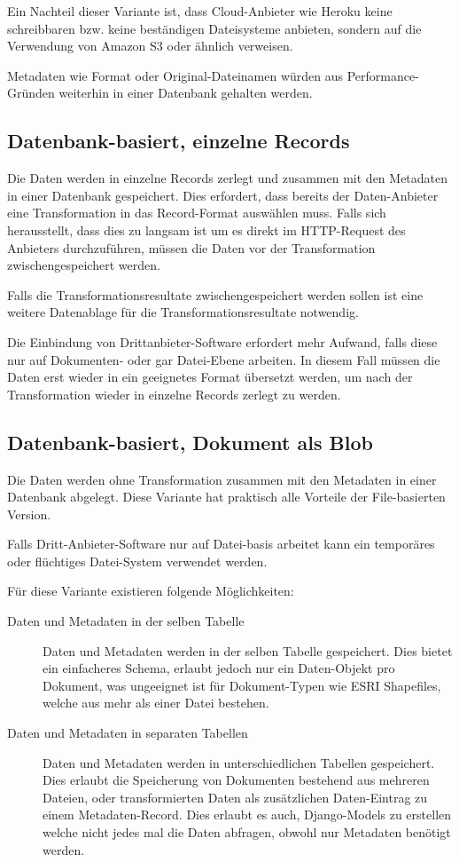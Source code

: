 Ein Nachteil dieser Variante ist, dass Cloud-Anbieter wie Heroku keine schreibbaren\cite{herokuReadOnlyFilesystem} bzw. keine beständigen\cite{herokuEphemeralFilesystem} Dateisysteme anbieten, sondern auf die Verwendung von Amazon S3 oder ähnlich verweisen.

Metadaten wie Format oder Original-Dateinamen würden aus Performance-Gründen weiterhin in einer Datenbank gehalten werden.

\subsection{Datenbank-basiert, einzelne Records}\label{sec:pd:datenbank-records}
Die Daten werden in einzelne Records zerlegt und zusammen mit den Metadaten in einer Datenbank gespeichert. Dies erfordert, dass bereits der Daten-Anbieter eine Transformation in das Record-Format auswählen muss. Falls sich herausstellt, dass dies zu langsam ist um es direkt im HTTP-Request des Anbieters durchzuführen, müssen die Daten vor der Transformation zwischengespeichert werden.

Falls die Transformationsresultate zwischengespeichert werden sollen ist eine weitere Datenablage für die Transformationsresultate notwendig.

Die Einbindung von Drittanbieter-Software erfordert mehr Aufwand, falls diese nur auf Dokumenten- oder gar Datei-Ebene arbeiten. In diesem Fall müssen die Daten erst wieder in ein geeignetes Format übersetzt werden, um nach der Transformation wieder in einzelne Records zerlegt zu werden.

\subsection{Datenbank-basiert, Dokument als Blob}
Die Daten werden ohne Transformation zusammen mit den Metadaten in einer Datenbank abgelegt. Diese Variante hat praktisch alle Vorteile der File-basierten Version.

Falls Dritt-Anbieter-Software nur auf Datei-basis arbeitet kann ein temporäres oder flüchtiges Datei-System verwendet werden.

Für diese Variante existieren folgende Möglichkeiten:
\begin{description}
\item[Daten und Metadaten in der selben Tabelle] Daten und Metadaten werden in der selben Tabelle gespeichert. Dies bietet ein einfacheres Schema, erlaubt jedoch nur ein Daten-Objekt pro Dokument, was ungeeignet ist für Dokument-Typen wie ESRI Shapefiles, welche aus mehr als einer Datei bestehen.
\item[Daten und Metadaten in separaten Tabellen] Daten und Metadaten werden in unterschiedlichen Tabellen gespeichert. Dies erlaubt die Speicherung von Dokumenten bestehend aus mehreren Dateien, oder transformierten Daten als zusätzlichen Daten-Eintrag zu einem Metadaten-Record. Dies erlaubt es auch, Django-Models zu erstellen welche nicht jedes mal die Daten abfragen, obwohl nur Metadaten benötigt werden.
\end{description}

